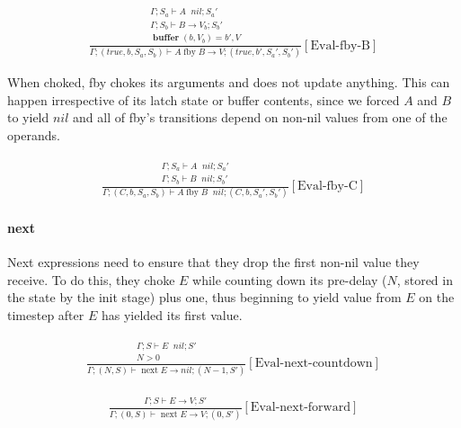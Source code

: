 \documentclass{scrartcl}
\DeclareMathOperator{\fby}{fby}
\DeclareMathOperator{\nextop}{next}
\DeclareMathOperator{\ceval}{\overset{C}{\rightarrow}}
\DeclareMathOperator{\buffer}{\mathbf{buffer}}
\begin{document}
    \begin{align*}
    \frac{
        \begin{matrix}
        \Gamma; S_a \vdash A \ceval nil; S_a' \\
        \Gamma; S_b \vdash B \rightarrow V_b; S_b' \\
        \buffer(b, V_b) = b', V
        \end{matrix}
    }{
        \Gamma; (true, b, S_a, S_b) \vdash A \fby B \rightarrow V; (true, b', S_a', S_b')
    }[\text{Eval-fby-B}]
    \end{align*}
    
    When choked, fby chokes its arguments and does not update anything. This can happen irrespective of its latch state or buffer contents, since we forced $A$ and $B$ to yield $nil$ and all of fby's transitions depend on non-nil values from one of the operands.
    
    \begin{align*}
    \frac{
        \begin{matrix}
        \Gamma; S_a \vdash A \ceval nil; S_a' \\
        \Gamma; S_b \vdash B \ceval nil; S_b'
        \end{matrix}
    }{
        \Gamma; (C, b, S_a, S_b) \vdash A \fby B \ceval nil; (C, b, S_a', S_b')
    }[\text{Eval-fby-C}]
    \end{align*}
    
    \paragraph{next}
    
    Next expressions need to ensure that they drop the first non-nil value they receive. To do this, they choke $E$ while counting down its pre-delay ($N$, stored in the state by the init stage) plus one, thus beginning to yield value from $E$ on the timestep after $E$ has yielded its first value.
    
    \begin{align*}
    \frac{
        \begin{matrix}
        \Gamma; S \vdash E \ceval nil; S' \\
        N > 0
        \end{matrix}
    }{
        \Gamma; (N, S) \vdash \nextop E \rightarrow nil; (N-1, S')
    }[\text{Eval-next-countdown}]
    \end{align*}
    
    \begin{align*}
    \frac{
        \begin{matrix}
        \Gamma; S \vdash E \rightarrow V; S'
        \end{matrix}
    }{
        \Gamma; (0, S) \vdash \nextop E \rightarrow V; (0, S')
    }[\text{Eval-next-forward}]
    \end{align*}
    
\end{document}
